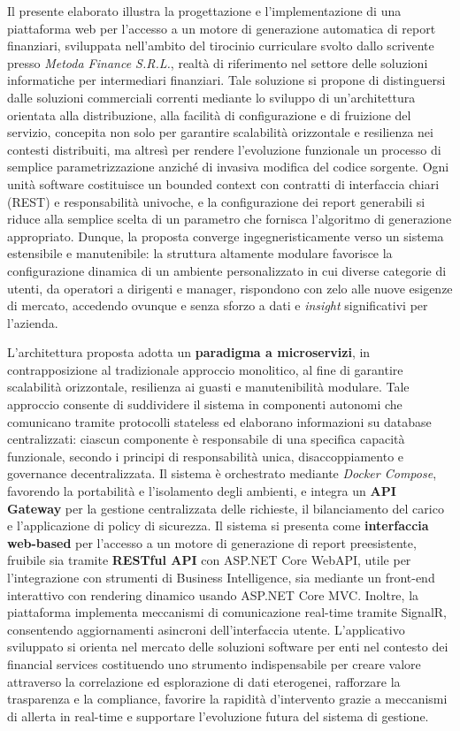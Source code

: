 Il presente elaborato illustra la progettazione e l’implementazione di una piattaforma web per l'accesso a un motore di generazione automatica di report finanziari, sviluppata nell’ambito del tirocinio curriculare svolto dallo scrivente presso \emph{Metoda Finance S.R.L.}, realtà di riferimento nel settore delle soluzioni informatiche per intermediari finanziari.
Tale soluzione si propone di distinguersi dalle soluzioni commerciali correnti mediante lo sviluppo di un’architettura orientata alla distribuzione, alla facilità di configurazione e di fruizione del servizio, concepita non solo per garantire scalabilità orizzontale e resilienza nei contesti distribuiti, ma altresì per rendere l’evoluzione funzionale un processo di semplice parametrizzazione anziché di invasiva modifica del codice sorgente. Ogni unità software costituisce un bounded context con contratti di interfaccia chiari (REST) e responsabilità univoche, e la configurazione dei report generabili si riduce alla semplice scelta di un parametro che fornisca l'algoritmo di generazione appropriato.
Dunque, la proposta converge ingegneristicamente verso un sistema estensibile e manutenibile: la struttura altamente modulare favorisce la configurazione dinamica di un ambiente personalizzato in cui diverse categorie di utenti, da operatori a dirigenti e manager, rispondono con zelo alle nuove esigenze di mercato, accedendo ovunque e senza sforzo a dati e \emph{insight} significativi per l'azienda.

L'architettura proposta adotta un \textbf{paradigma a microservizi}, in contrapposizione al tradizionale approccio monolitico, al fine di garantire scalabilità orizzontale, resilienza ai guasti e manutenibilità modulare. Tale approccio consente di suddividere il sistema in componenti autonomi che comunicano tramite protocolli stateless ed elaborano informazioni su database centralizzati: ciascun componente è responsabile di una specifica capacità funzionale, secondo i principi di responsabilità unica, disaccoppiamento e governance decentralizzata. Il sistema è orchestrato mediante \emph{Docker Compose}, favorendo la portabilità e l'isolamento degli ambienti, e integra un \textbf{API Gateway} per la gestione centralizzata delle richieste, il bilanciamento del carico e l’applicazione di policy di sicurezza.
Il sistema si presenta come \textbf{interfaccia web-based} per l’accesso a un motore di generazione di report preesistente, fruibile sia tramite \textbf{RESTful API} con ASP.NET Core WebAPI, utile per l’integrazione con strumenti di Business Intelligence, sia mediante un front-end interattivo con rendering dinamico usando ASP.NET Core MVC. Inoltre, la piattaforma implementa meccanismi di comunicazione real-time tramite SignalR, consentendo aggiornamenti asincroni dell'interfaccia utente.
L'applicativo sviluppato si orienta nel mercato delle soluzioni software per enti nel contesto dei financial services costituendo uno strumento indispensabile per creare valore attraverso la correlazione ed esplorazione di dati eterogenei, rafforzare la trasparenza e la compliance, favorire la rapidità d'intervento grazie a meccanismi di allerta in real-time e supportare l’evoluzione futura del sistema di gestione.